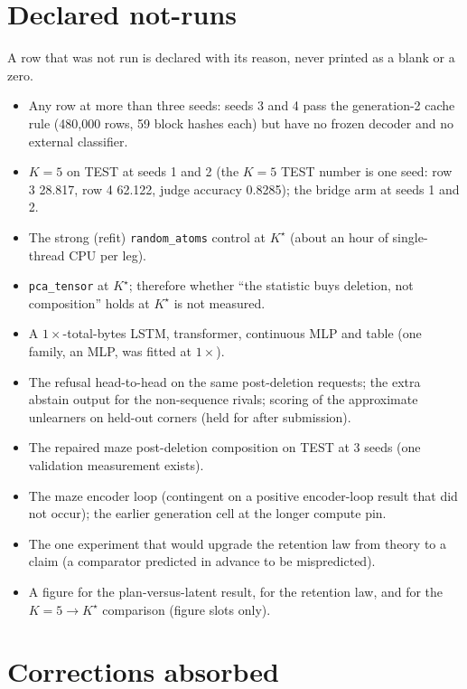 \documentclass{article}
\newcommand{\Kstar}{\ensuremath{K^{\star}}}
\begin{document}
\section{Declared not-runs}
\label{app:notrun}

A row that was not run is declared with its reason, never printed as a blank or a zero.
\begin{itemize}[leftmargin=*,itemsep=1pt]
\item Any row at more than three seeds: seeds 3 and 4 pass the generation-2 cache rule
  (480,000 rows, 59 block hashes each) but have no frozen decoder and no external classifier.
\item $K=5$ on TEST at seeds 1 and 2 (the $K=5$ TEST number is one seed: row 3 28.817, row 4
  62.122, judge accuracy 0.8285); the bridge arm at seeds 1 and 2.
\item The strong (refit) \texttt{random\_atoms} control at $\Kstar$ (about an hour of
  single-thread CPU per leg).
\item \texttt{pca\_tensor} at $\Kstar$; therefore whether ``the statistic buys deletion, not
  composition'' holds at $\Kstar$ is not measured.
\item A $1\times$-total-bytes LSTM, transformer, continuous MLP and table (one family, an MLP, was
  fitted at $1\times$).
\item The refusal head-to-head on the same post-deletion requests; the extra abstain output for the
  non-sequence rivals; scoring of the approximate unlearners on held-out corners (held for after
  submission).
\item The repaired maze post-deletion composition on TEST at 3 seeds (one validation measurement
  exists).
\item The maze encoder loop (contingent on a positive encoder-loop result that did not occur); the
  earlier generation cell at the longer compute pin.
\item The one experiment that would upgrade the retention law from theory to a claim (a comparator
  predicted in advance to be mispredicted).
\item A figure for the plan-versus-latent result, for the retention law, and for the $K=5\to\Kstar$
  comparison (figure slots only).
\end{itemize}

\section{Corrections absorbed}
\label{app:corrections}
\end{document}
